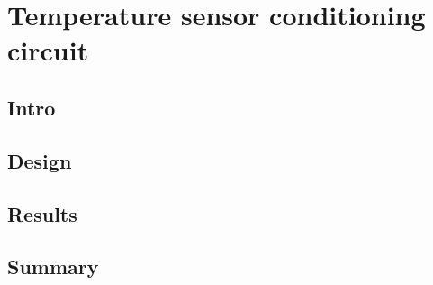 \chapter{Temperature sensor conditioning circuit}\label{sec:temp_sensor}

\section{Intro} \label{sec:temp_intro}

\section{Design}\label{sec:temp_design}

\section{Results} \label{sec:temp_results}

\section{Summary}\label{sec:temp_summary}



